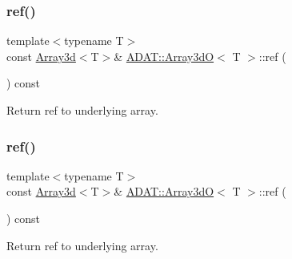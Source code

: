 \mbox{\label{classADAT_1_1Array3dO_a7ad48358af907cbaf3cf50fad298a088}} 
\subsubsection{\texorpdfstring{ref()}{ref()}\hspace{0.1cm}{\footnotesize\ttfamily [1/4]}}
{\footnotesize\ttfamily template$<$typename T$>$ \\
const \mbox{\hyperlink{classXMLArray_1_1Array3d}{Array3d}}$<$T$>$\& \mbox{\hyperlink{classADAT_1_1Array3dO}{A\+D\+A\+T\+::\+Array3dO}}$<$ T $>$\+::ref (\begin{DoxyParamCaption}{ }\end{DoxyParamCaption}) const\hspace{0.3cm}{\ttfamily [inline]}}



Return ref to underlying array. 

\mbox{\label{classADAT_1_1Array3dO_a7ad48358af907cbaf3cf50fad298a088}} 
\subsubsection{\texorpdfstring{ref()}{ref()}\hspace{0.1cm}{\footnotesize\ttfamily [2/4]}}
{\footnotesize\ttfamily template$<$typename T$>$ \\
const \mbox{\hyperlink{classXMLArray_1_1Array3d}{Array3d}}$<$T$>$\& \mbox{\hyperlink{classADAT_1_1Array3dO}{A\+D\+A\+T\+::\+Array3dO}}$<$ T $>$\+::ref (\begin{DoxyParamCaption}{ }\end{DoxyParamCaption}) const\hspace{0.3cm}{\ttfamily [inline]}}



Return ref to underlying array. 

